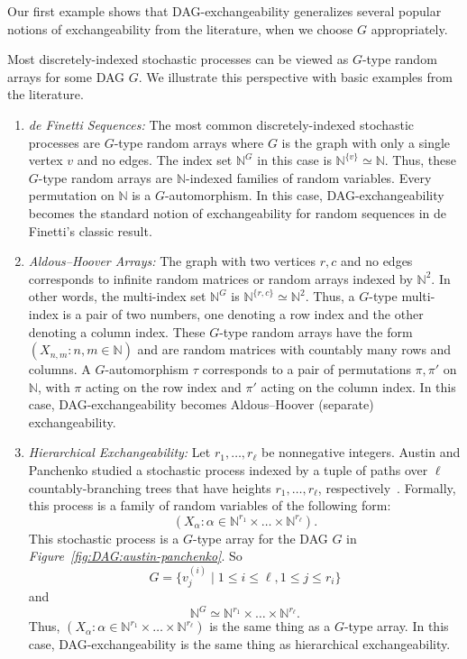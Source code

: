 \documentclass[AHL,Unicode,longabstracts,published]{cedram}
\newcommand{\alf}{\alpha}%
\newcommand{\indices}[1]{\mathbb{N}^{#1}}
\newcommand*\N{\mathbb{N}}
\newcommand*{\alphenumi}{\renewcommand*{\theenumi}{\alph{enumi}}}
\newcommand*\N{\mathbb{N}}
\begin{document}
Our first example shows that DAG-exchangeability generalizes several popular notions of exchangeability from the literature, when we choose $G$ appropriately.

\begin{exam}\label{ex:known}
Most discretely-indexed stochastic processes can be viewed as $G$-type random arrays for some DAG $G$. We illustrate this perspective with basic examples from the literature.
\begin{enumerate}\alphenumi
\item \label{list2.1.1}\emph{de Finetti Sequences:} The most common discretely-indexed stochastic processes are $G$-type random arrays where $G$ is the graph with only a single vertex $v$ and no edges. The index set $\indices G$ in this case is $\mathbb{N}^{\{v\}} \simeq \mathbb{N}$. Thus, these $G$-type random arrays are $\mathbb{N}$-indexed families of random variables. Every permutation on $\mathbb{N}$ is a $G$-automorphism. In this case, DAG-exchangeability becomes the standard notion of exchangeability for random sequences in de Finetti's classic result.

\item \label{list2.1.2}\emph{Aldous--Hoover Arrays:} The graph with two vertices ${r,c}$ and no edges corresponds to infinite random matrices or random arrays indexed by $\N^2$. In other words, the multi-index set $\indices G$ is $\mathbb{N}^{\{r,c\}} \simeq \mathbb{N}^2$. Thus, a $G$-type multi-index is a pair of two numbers, one denoting a row index and the other denoting a column index. These $G$-type random arrays have the form $(X_{n,m} : n,m \in \mathbb{N})$ and are random matrices with countably many rows and columns. {A $G$-automorphism $\tau$ corresponds to a pair of permutations $\pi,\pi'$ on $\mathbb{N}$, with $\pi$ acting on the row index and $\pi'$ acting on the column index.} In this case, DAG-exchangeability becomes Aldous--Hoover (separate) exchangeability.

\item \label{list2.1.3}\emph{Hierarchical Exchangeability:} Let $r_1,\ldots,r_\ell$ be nonnegative integers. Austin and Panchenko studied a stochastic process indexed by a tuple of paths over $\ell$ countably-branching trees that have heights $r_1,\ldots,r_\ell$, respectively~\cite{austin:panchenko:2014}. Formally, this process is a family of random variables of the following form:
\[
(X_\alf : \alf \in \mathbb{N}^{r_1} \times \ldots \times \mathbb{N}^{r_\ell}).
\]
This stochastic process is a $G$-type array for the DAG $G$ in \emph{Figure~\ref{fig:DAG:austin-panchenko}}. So
\[
G = {\{v^{(i)}_j \mid 1 \leq i \leq \ell, 1 \leq j \leq r_i\}}
\]
and
\[
\mathbb{N}^G
\simeq \mathbb{N}^{r_1} \times \ldots \times \mathbb{N}^{r_\ell}.
\]
Thus, $(X_\alf : \alf \in \mathbb{N}^{r_1} \times \ldots \times \mathbb{N}^{r_\ell})$ is the same thing as a $G$-type array. In this case, DAG-exchangeability is the same thing as hierarchical exchangeability.
\end{enumerate}
\end{exam}
\end{document}
